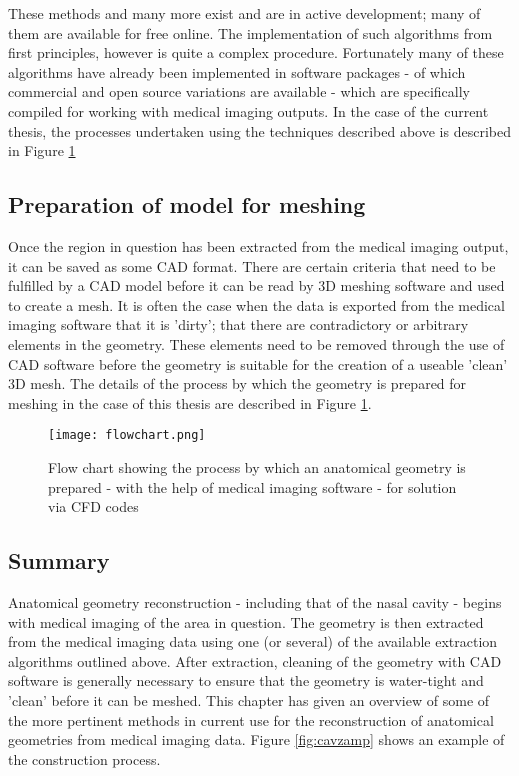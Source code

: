 These methods and many more exist and are in active development; many of them are available for free online. The implementation of such algorithms from first principles, however is quite a complex procedure. Fortunately many of these algorithms have already been implemented in software packages - of which commercial and open source variations are available - which are specifically compiled for working with medical imaging outputs. 
In the case of the current thesis, the processes undertaken using the techniques described above is described in Figure \ref{fig:segchart}

\subsection{Preparation of model for meshing}

Once the region in question has been extracted from the medical imaging output, it can be saved as some CAD format. There are certain criteria that need to be fulfilled by a CAD model before it can be read by 3D meshing software and used to create a mesh. It is often the case when the data is exported from the medical imaging software that it is 'dirty'; that there are contradictory or arbitrary elements in the geometry. These elements need to be removed through the use of CAD software before the geometry is suitable for the creation of a useable 'clean' 3D mesh. The details of the process by which the geometry is prepared for meshing in the case of this thesis are described in Figure \ref{fig:segchart}.


\begin{figure}
  \texttt{[image: flowchart.png]}
\caption{Flow chart showing the process by which an anatomical geometry is prepared - with the help of medical imaging software - for solution via CFD codes} \label{fig:segchart}
\centering
\end{figure}
  
\subsection{Summary} 

Anatomical geometry reconstruction - including that of the nasal cavity - begins with medical imaging of the area in question. The geometry is then extracted from the medical imaging data using one (or several) of the available extraction algorithms outlined above. After extraction, cleaning of the geometry with CAD software is generally necessary to ensure that the geometry is water-tight and 'clean' before it can be meshed. This chapter has given an overview of some of the more pertinent methods in current use for the reconstruction of anatomical geometries from medical imaging data. Figure \ref{fig:cavzamp} shows an example of the construction process. 

